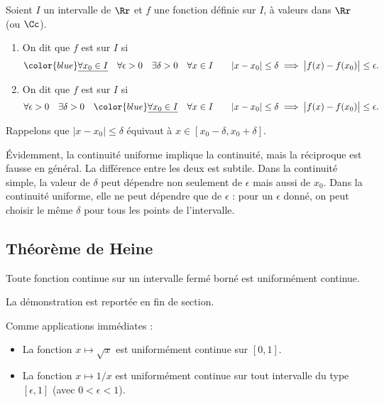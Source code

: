 \documentclass[class=report,crop=false]{standalone}
\begin{document}
\begin{definition}
\label{def:contunif}
Soient $I$ un intervalle de $\Rr$ et $f$ une fonction définie sur $I$,
à valeurs dans $\Rr$ (ou $\Cc$).
\begin{enumerate}
\item
On dit que $f$ est  sur $I$ si
$${\color{blue}\underline{\forall x_0\in I}}\quad\forall \epsilon>0\quad\exists \delta>0
\quad\forall x\in I\qquad |x-x_0| \le \delta \implies \big|f(x)-f(x_0)\big|\le \epsilon.$$

\item
On dit que $f$ est  sur $I$ si
$$\forall \epsilon>0\quad\exists \delta>0\quad{\color{blue}\underline{\forall x_0\in I}}
\quad\forall x\in I\qquad |x-x_0| \le \delta \implies \big|f(x)-f(x_0)\big|\le \epsilon.$$

\end{enumerate}
\end{definition}



Rappelons que $|x-x_0| \le \delta$ équivaut à $x \in [x_0-\delta,x_0+\delta]$.

\'Evidemment, la continuité uniforme implique la continuité, mais la 
réciproque est fausse en général. 
La différence entre les deux est subtile. Dans
la continuité simple, la valeur de $\delta$ peut dépendre non seulement de
$\epsilon$ mais aussi de $x_0$. 
Dans la continuité uniforme, elle ne peut dépendre
que de $\epsilon$ : pour un $\epsilon$ donné, on peut choisir le même
$\delta$ pour tous les points de l'intervalle. 

\subsection{Théorème de Heine}

\begin{theoreme}
\label{th:heine}
Toute fonction continue sur un intervalle fermé borné est
uniformément continue.
\end{theoreme}

La démonstration est reportée en fin de section.

\medskip

Comme applications immédiates :
\begin{itemize}
  \item La fonction $x\mapsto \sqrt{x}$ est uniformément continue sur
$[0,1]$.
  
  \item La fonction $x\mapsto 1/x$ est uniformément continue sur tout intervalle
  du type $[\epsilon,1]$ (avec $0<\epsilon<1$).
\end{itemize}
\end{document}
